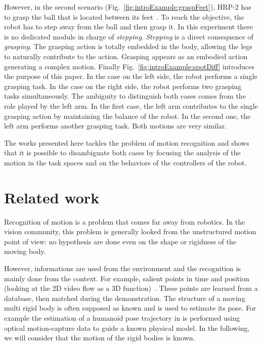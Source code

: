 \documentclass[letterpaper, 10pt, conference]{ieeeconf}      %
\begin{document}
However, in the second scenario (Fig.~\ref{fig:introExample:graspFeet}),
HRP-2 has to grasp the ball that is located between its feet~\cite{kanoun10}. To reach the
objective, the robot has to step away from the ball and then grasp it. In this
experiment there is no dedicated module in charge of \emph{stepping}. \emph{Stepping} is
a direct consequence of \emph{grasping}. The grasping action is totally embedded in
the body, allowing the legs to naturally contribute to the action. Grasping
appears as an embodied action generating a complex motion. Finally Fig.~\ref{fig:introExample:spotDiff}
introduces the purpose of this paper. In the case on the left side, the robot
performs a single grasping task. In the case on the right side, the robot
performs two grasping tasks simultaneously. The ambiguity to distinguish both
cases comes from the role played by the left arm. In the first case, the left
arm contributes to the single grasping action by maintaining the balance of the
robot. In the second one, the left arm performs another grasping task. Both
motions are very similar. 

The works presented here tackles the problem of motion recognition and 
shows that it is possible to disambiguate both cases by focusing
the analysis of the motion in the task spaces and on
the behaviors of the controllers of the robot.

\section{Related work}
Recognition of motion is a problem that comes far away from robotics.
In the vision community, this problem is generally looked from the
unstructured motion point of view: no hypothesis are done
even on the shape or rigidness of the moving body.

However, informations are used from the environment and the recognition is mainly done from
the context. For example, salient points in time and position (looking at the 2D video
flow as a 3D function)~\cite{laptev05}. These points are learned from a database, then
matched during the demonstration. 
The structure of a moving multi rigid body is often supposed as known
and is used to estimate its pose. For example the estimation
of a humanoid pose trajectory in \cite{zordan03} is performed 
using optical motion-capture data to guide a known physical model.
In the following, we will consider that the motion of the rigid bodies is known.
\end{document}
